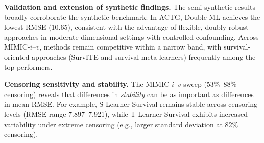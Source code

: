 

\textbf{Validation and extension of synthetic findings.} The semi-synthetic results broadly corroborate the synthetic benchmark: In ACTG,  Double-ML achieves the lowest RMSE (10.65), consistent with the advantage of flexible, doubly robust approaches in moderate-dimensional settings with controlled confounding.
Across MIMIC-$i$--$v$, methods remain competitive within a narrow band, with survival-oriented approaches (SurvITE and survival meta-learners) frequently among the top performers.

\textbf{Censoring sensitivity and stability.} The MIMIC-$i$--$v$ sweep (53\%--88\% censoring) reveals that differences in \emph{stability} can be as important as differences in mean RMSE.
For example, S-Learner-Survival remains stable across censoring levels (RMSE range 7.897--7.921), while T-Learner-Survival exhibits increased variability under extreme censoring (e.g., larger standard deviation at 82\% censoring).

